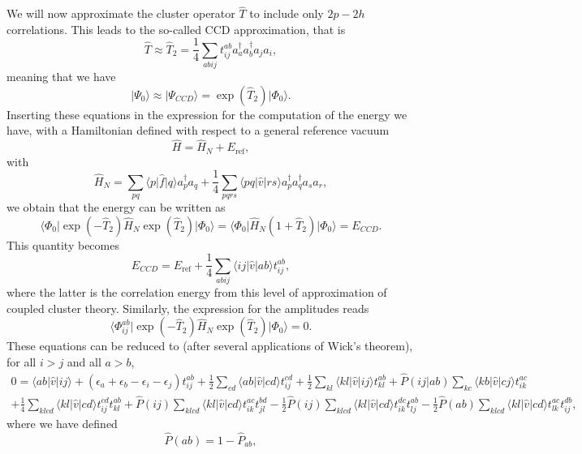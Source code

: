 \documentclass[%
oneside,                 %
final,                   %
10pt]{article}
\begin{document}
  We will now approximate the cluster operator $\hat{T}$ to include
  only $2p-2h$ correlations. This leads to the so-called CCD
  approximation, that is
  \[
  \hat{T}\approx
  \hat{T}_2=\frac{1}{4}\sum_{abij}t_{ij}^{ab}a^{\dagger}_aa^{\dagger}_ba_ja_i,
  \]
  meaning that we have
  \[
  \vert \Psi_0 \rangle \approx \vert \Psi_{CCD} \rangle =
  \exp{\left(\hat{T}_2\right)}\vert \Phi_0\rangle.
  \]
  Inserting these equations in the expression for the computation of
  the energy we have, with a Hamiltonian defined with respect to a
  general reference vacuum
  \[
  \hat{H}=\hat{H}_N+E_{\mathrm{ref}},
  \]
  with
  \[
  \hat{H}_N=\sum_{pq}\langle p \vert \hat{f} \vert q \rangle
  a^{\dagger}_pa_q + \frac{1}{4}\sum_{pqrs}\langle pq \vert \hat{v}
  \vert rs \rangle a^{\dagger}_pa^{\dagger}_qa_sa_r,
  \]
  we obtain that the energy can be written as
  \[
  \langle \Phi_0 \vert
  \exp{\left(-\hat{T}_2\right)}\hat{H}_N\exp{\left(\hat{T}_2\right)}\vert
  \Phi_0\rangle = \langle \Phi_0 \vert \hat{H}_N(1+\hat{T}_2)\vert
  \Phi_0\rangle = E_{CCD}.
  \]
  This quantity becomes
  \[
  E_{CCD}=E_{\mathrm{ref}}+\frac{1}{4}\sum_{abij}\langle ij \vert
  \hat{v} \vert ab \rangle t_{ij}^{ab},
  \]
  where the latter is the correlation energy from this level of
  approximation of coupled cluster  theory.  Similarly, the expression for the
  amplitudes reads 
  \[
  \langle \Phi_{ij}^{ab} \vert
  \exp{\left(-\hat{T}_2\right)}\hat{H}_N\exp{\left(\hat{T}_2\right)}\vert
  \Phi_0\rangle = 0.
  \]
  These equations can be reduced to (after several applications of
  Wick's theorem), for all $i > j$ and all $a > b$,
  \begin{align}
  0 = \langle ab \vert \hat{v} \vert ij \rangle +
  \left(\epsilon_a+\epsilon_b-\epsilon_i-\epsilon_j\right)t_{ij}^{ab}+\frac{1}{2}\sum_{cd} \langle ab \vert \hat{v} \vert
  cd \rangle t_{ij}^{cd}+\frac{1}{2}\sum_{kl} \langle kl \vert \hat{v}
  \vert ij \rangle t_{kl}^{ab}+\hat{P}(ij\vert ab)\sum_{kc} \langle kb
  \vert \hat{v} \vert cj \rangle t_{ik}^{ac} & \nonumber
  \\ +\frac{1}{4}\sum_{klcd} \langle kl \vert \hat{v} \vert cd \rangle
  t_{ij}^{cd}t_{kl}^{ab}+\hat{P}(ij)\sum_{klcd} \langle kl \vert
  \hat{v} \vert cd \rangle t_{ik}^{ac}t_{jl}^{bd}-\frac{1}{2}\hat{P}(ij)\sum_{klcd} \langle kl \vert \hat{v} \vert
  cd \rangle t_{ik}^{dc}t_{lj}^{ab}-\frac{1}{2}\hat{P}(ab)\sum_{klcd}
  \langle kl \vert \hat{v} \vert cd \rangle t_{lk}^{ac}t_{ij}^{db},&
  \label{eq:ccd}
  \end{align}
  where we have defined
  \[
  \hat{P}\left(ab\right)= 1-\hat{P}_{ab},
  \]
\end{document}
